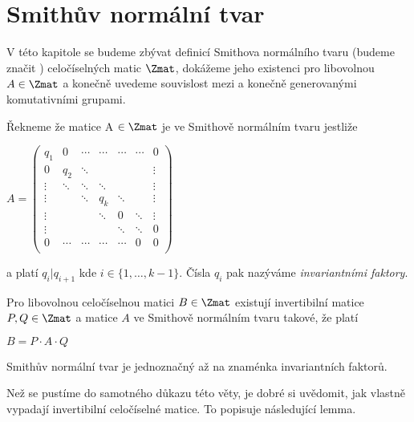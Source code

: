 \chapter{Smithův normální tvar}
\setcounter{page}{1}

V této kapitole se budeme zbývat definicí Smithova normálního tvaru (budeme značit \snf) celočíselných matic $\Zmat$, dokážeme jeho existenci pro libovolnou $A \in \Zmat$ a konečně uvedeme souvislost mezi \snf a konečně generovanými komutativními grupami.

\begin{defi}Řekneme že matice A $ \in \Zmat $ je ve Smithově normálním tvaru jestliže
\begin{center}
$ A =
    \begin{pmatrix}
        q_1     & 0      & \cdots & \cdots & \cdots & \cdots & 0      \\
        0       & q_2    & \ddots &        &        &        & \vdots \\
        \vdots  & \ddots & \ddots & \ddots &        &        & \vdots \\
        \vdots  &        & \ddots & q_k    & \ddots &        & \vdots \\
        \vdots  &        &        & \ddots & 0      & \ddots & \vdots \\
        \vdots  &        &        &        & \ddots & \ddots & 0      \\
        0       & \cdots & \cdots & \cdots & \cdots & 0      & 0      \\
    \end{pmatrix}
$
\end{center}
a platí $q_i | q_{i+1}$ kde $i \in \{1, \dots, k-1\}$. Čísla $q_i$ pak nazýváme
\textit{invariantními faktory}.
\end{defi}


\begin{vet}
    Pro libovolnou celočíselnou matici $ B \in \Zmat $ existují invertibilní
    matice $ P,Q \in \Zmat $ a matice $ A $ ve Smithově normálním tvaru takové,
    že platí
    \begin{center}
        $ B = P \cdot A \cdot Q $
    \end{center}
    Smithův normální tvar je jednoznačný až na znaménka invariantních faktorů.
\end{vet}


Než se pustíme do samotného důkazu této věty, je dobré si uvědomit, jak vlastně
vypadají invertibilní celočíselné matice. To popisuje následující lemma.


